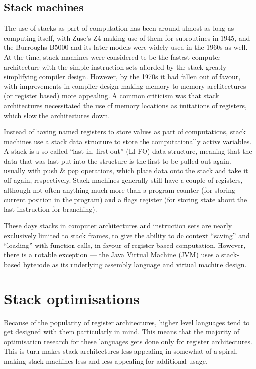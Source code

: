 \subsection{Stack machines}
The use of stacks as part of computation has been around almost as long as
computing itself, with Zuse's Z4 making use of them for subroutines in
1945,\cite{Speiser2000KZZ} and the Burroughs B5000 and its later models were
widely used in the 1960s as well.\cite{Organick2014Computer} At the time, stack
machines were considered to be the fastest computer architecture with the simple
instruction sets afforded by the stack greatly simplifying compiler design.
However, by the 1970s it had fallen out of favour, with improvements in compiler
design making memory-to-memory architectures (or register based) more
appealing. A common criticism was that stack architectures necessitated the use
of memory locations as imitations of registers, which slow the architectures
down.\cite{Myers1977CAS}

Instead of having named registers to store values as part of computations, stack
machines use a stack data structure to store the computationally active
variables. A stack is a so-called ``last-in, first out'' (LI-FO) data structure,
meaning that the data that was last put into the structure is the first to be
pulled out again, usually with push \& pop operations, which place data onto the
stack and take it off again, respectively. Stack machines generally still have a
couple of registers, although not often anything much more than a program
counter (for storing current position in the program) and a flags register (for
storing state about the last instruction for branching).

These days stacks in computer architectures and instruction sets are nearly
exclusively limited to stack frames, to give the ability to do context
``saving'' and ``loading'' with function calls, in favour of register based
computation. However, there is a notable exception --- the Java Virtual Machine
(JVM) uses a stack-based bytecode as its underlying assembly language and
virtual machine design.\cite{Schoeberl2005Design}

\section{Stack optimisations}

Because of the popularity of register architectures, higher level languages tend
to get designed with them particularly in mind. This means that the majority of
optimisation research for these languages gets done only for register
architectures. This is turn makes stack architectures less appealing in somewhat
of a spiral, making stack machines less and less appealing for additional usage.

